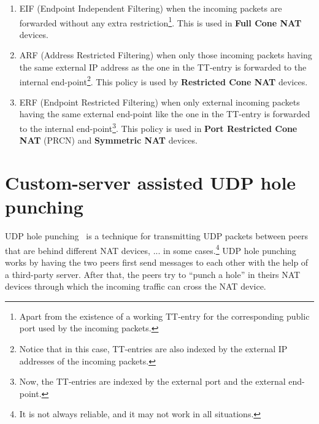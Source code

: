 \begin{enumerate}
\item EIF (Endpoint Independent Filtering) when the incoming packets
  are forwarded without any extra restriction\footnote{Apart from the
    existence of a working TT-entry for the corresponding public port
    used by the incoming packets.}. This is used in \textbf{Full Cone
    NAT} devices.
\item ARF (Address Restricted Filtering) when only those incoming
  packets having the same external IP address as the one in the
  TT-entry is forwarded to the internal end-point\footnote{Notice that
    in this case, TT-entries are also indexed by the external IP
    addresses of the incoming packets.}. This policy is used by
  \textbf{Restricted Cone NAT} devices.
\item ERF (Endpoint Restricted Filtering) when only external incoming
  packets having the same external end-point like the one in the
  TT-entry is forwarded to the internal end-point\footnote{Now, the
    TT-entries are indexed by the external port and the external
    end-point.}. This policy is used in \textbf{Port Restricted Cone
    NAT} (PRCN) and \textbf{Symmetric NAT} devices.
\end{enumerate}

\section{Custom-server assisted UDP hole punching}

UDP hole punching~\cite{srisuresh2008state} is a technique for
transmitting UDP packets between peers that are behind different NAT
devices, ... in some cases.\footnote{It is not always reliable, and it
  may not work in all situations.} UDP hole punching works by having
the two peers first send messages to each other with the help of a
third-party server. After that, the peers try to ``punch a hole'' in
theirs NAT devices through which the incoming traffic can cross the
NAT device.

